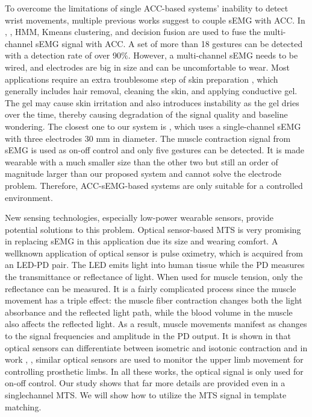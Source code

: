 To overcome the limitations of single ACC-based systems’
inability to detect wrist movements, multiple previous works
suggest to couple sEMG with ACC. In \cite{c15}, \cite{c16}, HMM, Kmeans
clustering, and decision fusion are used to fuse the
multi-channel sEMG signal with ACC. A set of more than
18 gestures can be detected with a detection rate of over
90$\%$. However, a multi-channel sEMG needs to be wired,
and electrodes are big in size and can be uncomfortable to
wear. Most applications require an extra troublesome step of
skin preparation \cite{c8}, which generally includes hair removal,
cleaning the skin, and applying conductive gel. The gel may
cause skin irritation and also introduces instability as the
gel dries over the time, thereby causing degradation of the
signal quality and baseline wondering. The closest one to our
system is \cite{c17}, which uses a single-channel sEMG with three
electrodes 30 mm in diameter. The muscle contraction signal
from sEMG is used as on-off control and only five gestures
can be detected. It is made wearable with a much smaller size
than the other two but still an order of magnitude larger than
our proposed system and cannot solve the electrode problem.
Therefore, ACC-sEMG-based systems are only suitable for a
controlled environment.

New sensing technologies, especially low-power wearable
sensors, provide potential solutions to this problem. Optical
sensor-based MTS is very promising in replacing sEMG in
this application due its size and wearing comfort. A wellknown
application of optical sensor is pulse oximetry, which
is acquired from an LED-PD pair. The LED emits light into
human tissue while the PD measures the transmittance or
reflectance of light. When used for muscle tension, only the
reflectance can be measured. It is a fairly complicated process
since the muscle movement has a triple effect: the muscle fiber
contraction changes both the light absorbance and the reflected
light path, while the blood volume in the muscle also affects
the reflected light. As a result, muscle movements manifest
as changes to the signal frequencies and amplitude in the PD
output. It is shown in \cite{c18} that optical sensors can differentiate
between isometric and isotonic contraction and in work \cite{c19},
\cite{c20}, similar optical sensors are used to monitor the upper
limb movement for controlling prosthetic limbs. In all these
works, the optical signal is only used for on-off control. Our
study shows that far more details are provided even in a singlechannel
MTS. We will show how to utilize the MTS signal in
template matching.